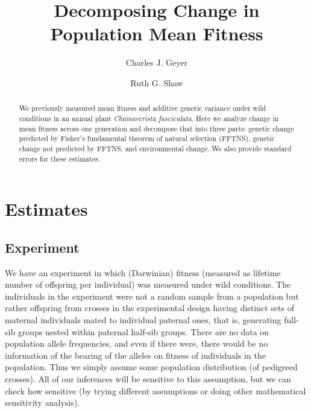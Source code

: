 \documentclass[11pt]{article}
\begin{document}
\title{Decomposing Change in Population Mean Fitness}

\author{Charles J. Geyer \and Ruth G. Shaw}

\maketitle

\begin{abstract}
We previously measured mean fitness and additive genetic variance
under wild conditions in an annual plant \emph{Chamaecrista fasciculata}.
Here we analyze change in mean fitness across one generation and
decompose that into three parts: genetic change predicted by Fisher's
fundamental theorem of natural selection (FFTNS),
genetic change not predicted by FFTNS, and environmental change.
We also provide standard errors for these estimates.
\end{abstract}

\section{Estimates}

\subsection{Experiment}

We have an experiment \citep{kulbaba,zenodo} in which (Darwinian) fitness
(measured as lifetime
number of offspring per individual) was measured under wild conditions.
The individuals in the experiment were not a random sample from
a population but rather offspring from crosses in the experimental design having distinct sets of maternal
individuals mated to individual paternal ones, that is,
generating full-sib groups nested within paternal half-sib
groups.  There are no data on
population allele frequencies, and even if there were, there would be
no information of the bearing of the alleles on fitness of individuals in the population. 
Thus we simply assume some population distribution (of
pedigreed crosses).  All of our inferences will be sensitive to this
assumption, but we can check how sensitive (by trying different assumptions
or doing other mathematical sensitivity analysis).
\end{document}
